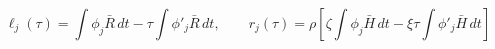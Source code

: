 \documentclass{article}
\begin{document}
\fontsize{22}{29}\selectfont
\[
\ell_j(\tau)=\int\phi_j\bar R\,dt-\tau\int\phi'_j\bar R\,dt,\qquad r_j(\tau)=\rho\!\left[\zeta\!\int\phi_j\bar H\,dt-\xi\tau\!\int\phi'_j\bar H\,dt\right]
\]
\end{document}
